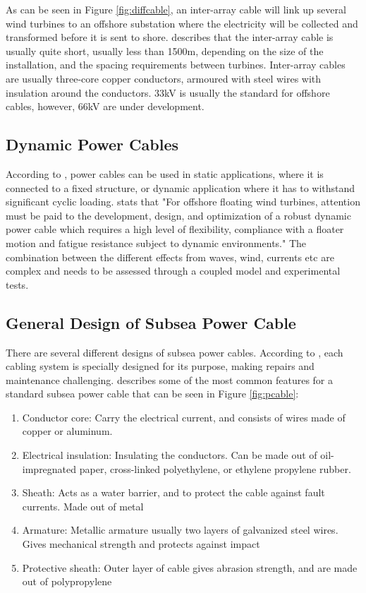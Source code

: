 \noindent As can be seen in Figure \ref{fig:diffcable}, an inter-array cable will link up several wind turbines to an offshore substation where the electricity will be collected and transformed before it is sent to shore. \cite{srinil2016} describes that the inter-array cable is usually quite short, usually less than 1500m, depending on the size of the installation, and the spacing requirements between turbines. Inter-array cables are usually three-core copper conductors, armoured with steel wires with insulation around the conductors. 33kV is usually the standard for offshore cables, however, 66kV are under development. \newline
\newline
  
  \subsection{Dynamic Power Cables}
According to \cite{Thies2012}, power cables can be used in static applications, where it is connected to a fixed structure, or dynamic application where it has to withstand significant cyclic loading. \cite{srinil2016} stats that "For offshore floating wind turbines, attention must be paid to the development, design, and optimization of a robust dynamic power cable which requires a high level of flexibility, compliance with a floater motion and fatigue resistance subject to dynamic environments." The combination between the different effects from waves, wind, currents etc are complex and needs to be assessed through a coupled model and experimental tests. 

\subsection{General Design of Subsea Power Cable}
There are several different designs of subsea power cables. According to \cite{Beckman}, each cabling system is specially designed for its purpose, making repairs and maintenance challenging. \cite{Thies2012} describes some of the most common features for a standard subsea power cable that can be seen in Figure \ref{fig:pcable}: 

\begin{enumerate}[label=\Alph*]
\item Conductor core: Carry the electrical current, and consists of wires made of copper or aluminum. 
\item Electrical insulation: Insulating the conductors. Can be made out of oil-impregnated paper, cross-linked polyethylene, or ethylene propylene rubber.
\item Sheath: Acts as a water barrier, and to protect the cable against fault currents. Made out of metal
\item Armature: Metallic armature usually two layers of galvanized steel wires. Gives mechanical strength and protects against impact
\item Protective sheath: Outer layer of cable gives abrasion strength, and are made out of polypropylene
\end{enumerate}

